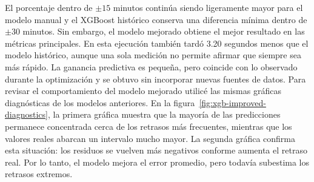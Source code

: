 \documentclass[a4paper,12pt,twocolumn]{report}
\begin{document}
\begin{table}[H]
	\centering
	\scriptsize
	\caption{Comparación final de los tres modelos congelados sobre \textit{test}. El tiempo de cada modelo incluye su preparación, entrenamiento y predicción.}
	\label{tab:xgb-improvement-test}
\end{table}

El porcentaje dentro de $\pm15$ minutos continúa siendo ligeramente mayor para el modelo manual y el XGBoost histórico conserva una diferencia mínima dentro de $\pm30$ minutos. Sin embargo, el modelo mejorado obtiene el mejor resultado en las métricas principales. En esta ejecución también tardó 3.20 segundos menos que el modelo histórico, aunque una sola medición no permite afirmar que siempre sea más rápido. La ganancia predictiva es pequeña, pero coincide con lo observado durante la optimización y se obtuvo sin incorporar nuevas fuentes de datos.
\newline
Para revisar el comportamiento del modelo mejorado utilicé las mismas gráficas diagnósticas de los modelos anteriores. En la figura~\ref{fig:xgb-improved-diagnostics}, la primera gráfica muestra que la mayoría de las predicciones permanece concentrada cerca de los retrasos más frecuentes, mientras que los valores reales abarcan un intervalo mucho mayor. La segunda gráfica confirma esta situación: los residuos se vuelven más negativos conforme aumenta el retraso real. Por lo tanto, el modelo mejora el error promedio, pero todavía subestima los retrasos extremos.
\end{document}
